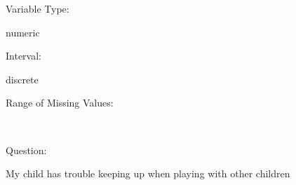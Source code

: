 \documentclass[
]{article}
\begin{document}
\begin{minipage}[t]{0.3\linewidth}

Variable Type:

\end{minipage}%
\begin{minipage}[t]{0.7\linewidth}

numeric

\end{minipage}

\begin{minipage}[t]{0.3\linewidth}

Interval:

\end{minipage}%
\begin{minipage}[t]{0.7\linewidth}

discrete

\end{minipage}

\begin{minipage}[t]{0.3\linewidth}

Range of Missing Values:

\end{minipage}%
\begin{minipage}[t]{0.7\linewidth}

~

\end{minipage}

\begin{minipage}[t]{0.3\linewidth}

Question:

\end{minipage}%
\begin{minipage}[t]{0.7\linewidth}

My child has trouble keeping up when playing with other children

\end{minipage}
\end{document}
